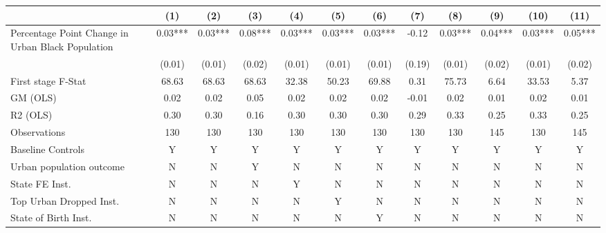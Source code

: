  \begin{tabular}{l*{11}{c}} \toprule
                    &\multicolumn{1}{c}{(1)}   &\multicolumn{1}{c}{(2)}   &\multicolumn{1}{c}{(3)}   &\multicolumn{1}{c}{(4)}   &\multicolumn{1}{c}{(5)}   &\multicolumn{1}{c}{(6)}   &\multicolumn{1}{c}{(7)}   &\multicolumn{1}{c}{(8)}   &\multicolumn{1}{c}{(9)}   &\multicolumn{1}{c}{(10)}   &\multicolumn{1}{c}{(11)}   \\
\midrule
Percentage Point Change in Urban Black Population&     0.03***&     0.03***&     0.08***&     0.03***&     0.03***&     0.03***&    -0.12   &     0.03***&     0.04***&     0.03***&     0.05***\\
                    &   (0.01)   &   (0.01)   &   (0.02)   &   (0.01)   &   (0.01)   &   (0.01)   &   (0.19)   &   (0.01)   &   (0.02)   &   (0.01)   &   (0.02)   \\
\midrule
First stage F-Stat  &    68.63   &    68.63   &    68.63   &    32.38   &    50.23   &    69.88   &     0.31   &    75.73   &     6.64   &    33.53   &     5.37   \\
GM (OLS)            &     0.02   &     0.02   &     0.05   &     0.02   &     0.02   &     0.02   &    -0.01   &     0.02   &     0.01   &     0.02   &     0.01   \\
R2 (OLS)            &     0.30   &     0.30   &     0.16   &     0.30   &     0.30   &     0.30   &     0.29   &     0.33   &     0.25   &     0.33   &     0.25   \\
Observations        &      130   &      130   &      130   &      130   &      130   &      130   &      130   &      130   &      145   &      130   &      145   \\
Baseline Controls   &        Y   &        Y   &        Y   &        Y   &        Y   &        Y   &        Y   &        Y   &        Y   &        Y   &        Y   \\
Urban population outcome&        N   &        N   &        Y   &        N   &        N   &        N   &        N   &        N   &        N   &        N   &        N   \\
State FE Inst.      &        N   &        N   &        N   &        Y   &        N   &        N   &        N   &        N   &        N   &        N   &        N   \\
Top Urban Dropped Inst.&        N   &        N   &        N   &        N   &        Y   &        N   &        N   &        N   &        N   &        N   &        N   \\
State of Birth Inst.&        N   &        N   &        N   &        N   &        N   &        Y   &        N   &        N   &        N   &        N   &        N   \\

\end{tabular}
